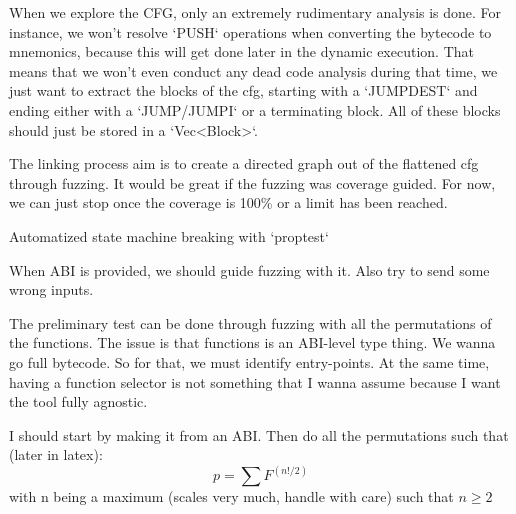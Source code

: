 \documentclass{article}
\begin{document}

When we explore the CFG, only an extremely rudimentary analysis is done.
For instance, we won't resolve `PUSH` operations when converting the bytecode to mnemonics, because this will get done later in the dynamic execution.
That means that we won't even conduct any dead code analysis during that time, we just want to extract the blocks of the cfg, starting with a `JUMPDEST` and ending either with a `JUMP/JUMPI` or a terminating block.
All of these blocks should just be stored in a `Vec<Block>`.


The linking process aim is to create a directed graph out of the flattened cfg through fuzzing.
It would be great if the fuzzing was coverage guided.
For now, we can just stop once the coverage is 100\% or a limit has been reached.

Automatized state machine breaking with `proptest` 

When ABI is provided, we should guide fuzzing with it. Also try to send some wrong inputs.


The preliminary test can be done through fuzzing with all the permutations of the functions. The issue is that functions is an ABI-level type thing. We wanna go full bytecode.
So for that, we must identify entry-points. At the same time, having a function selector is not something that I wanna assume because I want the tool fully agnostic.


I should start by making it from an ABI. 
Then do all the permutations such that (later in latex):
$$ p = \sum F^{(n!/2)} $$
with n being a maximum (scales very much, handle with care) such that $n \ge 2$
\end{document}
